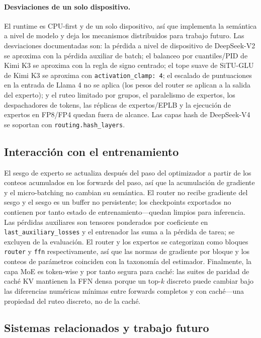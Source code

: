 \paragraph{Desviaciones de un solo dispositivo.}
El runtime es CPU-first y de un solo dispositivo, así que implementa la
semántica a nivel de modelo y deja los mecanismos distribuidos para trabajo
futuro. Las desviaciones documentadas son: la pérdida a nivel de dispositivo de
DeepSeek-V2 se aproxima con la pérdida auxiliar de batch; el balanceo por
cuantiles/PID de Kimi K3 se aproxima con la regla de signo centrado; el tope
suave de SiTU-GLU de Kimi K3 se aproxima con \texttt{activation\_clamp: 4}; el
escalado de puntuaciones en la entrada de Llama 4 no se aplica (los pesos del
router se aplican a la salida del experto); y el ruteo limitado por grupos, el
paralelismo de expertos, los despachadores de tokens, las réplicas de
expertos/EPLB y la ejecución de expertos en FP8/FP4 quedan fuera de alcance.
Las capas hash de DeepSeek-V4 se soportan con \texttt{routing.hash\_layers}.

\subsection{Interacción con el entrenamiento}
\label{app:moe-training-es}

El sesgo de experto se actualiza después del paso del optimizador a partir de
los conteos acumulados en los forwards del paso, así que la acumulación de
gradiente y el micro-batching no cambian su semántica. El router no recibe
gradiente del sesgo y el sesgo es un buffer no persistente; los checkpoints
exportados no contienen por tanto estado de entrenamiento---quedan limpios para
inferencia. Las pérdidas auxiliares son tensores ponderados por coeficiente en
\texttt{last\_auxiliary\_losses} y el entrenador las suma a la pérdida de
tarea; se excluyen de la evaluación. El router y los expertos se categorizan
como bloques \texttt{router} y \texttt{ffn} respectivamente, así que las normas
de gradiente por bloque y los conteos de parámetros coinciden con la taxonomía
del estimador. Finalmente, la capa MoE es token-wise y por tanto segura para
caché: las suites de paridad de caché KV mantienen la FFN densa porque un
top-$k$ discreto puede cambiar bajo las diferencias numéricas mínimas entre
forwards completos y con caché---una propiedad del ruteo discreto, no de la
caché.

\subsection{Sistemas relacionados y trabajo futuro}
\label{app:moe-future-es}

